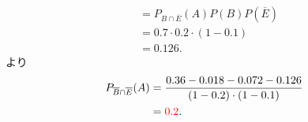 \begin{qenumerate}
{\begin{enumerate}
{\begin{align}
						&= P_{B\cap \overline{E}}(A)P(B)P\left(\overline{E}\right) \\
						&= 0.7\cdot 0.2\cdot (1 - 0.1) \\
						&= 0.126.
				\end{align}
				より
				\begin{align}
					P_{\overline{B}\cap\overline{E}}(A) &= \frac{0.36 - 0.018 - 0.072 - 0.126}{(1 - 0.2)\cdot (1 - 0.1)} \\
						&= \textcolor{red}{0.2}.
				\end{align}
			}
		\end{enumerate}
	}
\end{qenumerate}